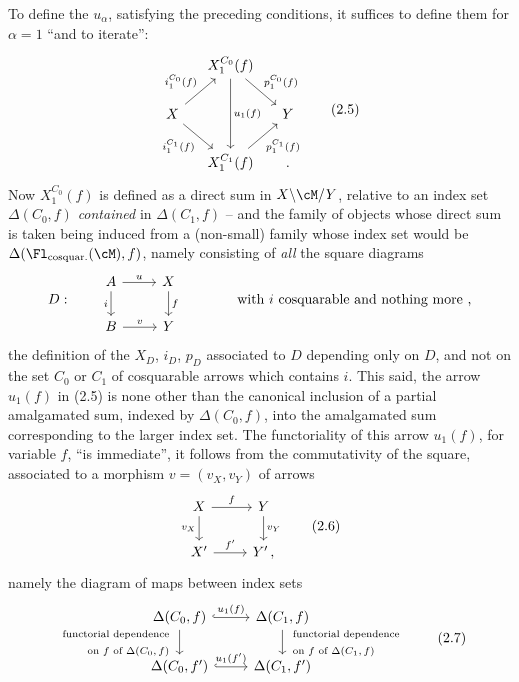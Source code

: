 
To define the $u_\alpha$, satisfying the preceding conditions, it suffices to define them for $\alpha=1$ ``and to iterate'':
\[
\begin{tikzcd}[column sep=small]
& X_1^{C_0}(f) \arrow[dd, "u_1(f)"] \arrow[dr, "p_1^{C_0}(f)"] & \\
X \arrow[ur, "i_1^{C_0}(f)"] \arrow[dr, "i_1^{C_1}(f)"'] & & Y \\
& X_1^{C_1}(f) \arrow[ur, "p_1^{C_1}(f)"'] & {}.
\end{tikzcd}
\tag*{(2.5)}
\]
Now $X_1^{C_0}(f)$ is defined as a direct sum in $X\backslash\cM/Y$, relative to an index set $\Delta(C_0,f)$ \textit{contained} in $\Delta(C_1,f)$ -- and the family of objects whose direct sum is taken being induced from a (non-small) family whose index set would be $\Delta(\Fl_{\text{cosquar.}}(\cM),f)$, namely consisting of \textit{all} the square diagrams
\[
D : \qquad
\begin{tikzcd}
A \arrow[r, "u"] \arrow[d, "i"'] & X \arrow[d, "f"] \\
B \arrow[r, "v"] & Y
\end{tikzcd}
\qquad\qquad \text{with $i$ cosquarable and nothing more ,}
\]
the definition of the $X_D$, $i_D$, $p_D$ associated to $D$ depending only on $D$, and not on the set $C_0$ or $C_1$ of cosquarable arrows which contains $i$. This said, the arrow $u_1(f)$
in (2.5) is none other than the canonical inclusion of a partial amalgamated sum, indexed by $\Delta(C_0,f)$, into the amalgamated sum corresponding to the larger index set. The functoriality of this arrow $u_1(f)$, for variable $f$, ``is immediate'', it follows from the commutativity of the square, associated to a morphism $v=(v_X,v_Y)$ of arrows
\[
\begin{tikzcd}
X \arrow[r, "f"] \arrow[d, "v_X"'] & Y \arrow[d, "v_Y"] \\
X' \arrow[r, "f'"] & Y'\,,
\end{tikzcd}
\tag*{(2.6)}
\]
namely the diagram of maps between index sets
\[
\begin{tikzcd}
\Delta(C_0,f) \arrow[r, hook, "u_1(f)"] \arrow[d, "{\begin{array}{r}\text{functorial dependence}\\ \text{on $f$ of $\Delta(C_0,f)$}\end{array}}"'] & \Delta(C_1,f) \arrow[d, "{\begin{array}{l}\text{functorial dependence}\\ \text{on $f$ of $\Delta(C_1,f)$}\end{array}}"] \\
\Delta(C_0,f') \arrow[r, hook, "u_1(f')"] & \Delta(C_1,f')
\end{tikzcd}
\tag*{(2.7)}
\]
